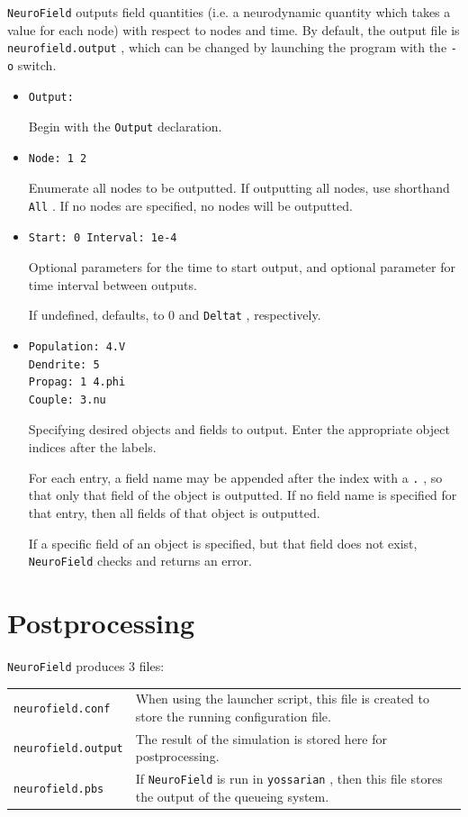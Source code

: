 \documentclass[12pt,a4paper]{article}
\newcommand{\type}[1]{ {\small\small\tt #1} }
\newcommand{\NF}[0]{ \type{NeuroField}}
\begin{document}
\NF outputs field quantities (i.e. a neurodynamic quantity which takes a value for each node) with respect to nodes and time. By default, the output file is \type{neurofield.output}, which can be changed by launching the program with the \type{-o} switch.

\begin{itemize}
	\item \begin{lstlisting}
Output:
		\end{lstlisting}
Begin with the \type{Output} declaration.
\item \begin{lstlisting}
Node: 1 2
\end{lstlisting}
Enumerate all nodes to be outputted. If outputting all nodes, use shorthand \type{All}. If no nodes are specified, no nodes will be outputted.
\item \begin{lstlisting}
Start: 0 Interval: 1e-4
\end{lstlisting}
Optional parameters for the time to start output, and optional parameter for time interval between outputs.

If undefined, defaults, to 0 and \type{Deltat}, respectively.
\item \begin{lstlisting}
Population: 4.V
Dendrite: 5
Propag: 1 4.phi
Couple: 3.nu
\end{lstlisting}
Specifying desired objects and fields to output. Enter the appropriate object indices after the labels.

For each entry, a field name may be appended after the index with a \type{.}, so that only that field of the object is outputted. If no field name is specified for that entry, then all fields of that object is outputted.

If a specific field of an object is specified, but that field does not exist, \NF checks and returns an error.

\end{itemize}

\section{Postprocessing}

\NF produces 3 files:

\begin{tabular}{l p{14.4cm}}
\type{neurofield.conf}& When using the launcher script, this file is created to store the running configuration file.\\
\type{neurofield.output}& The result of the simulation is stored here for postprocessing.\\
\type{neurofield.pbs}& If \NF is run in \type{yossarian}, then this file stores the output of the queueing system.
\end{tabular}
\end{document}
